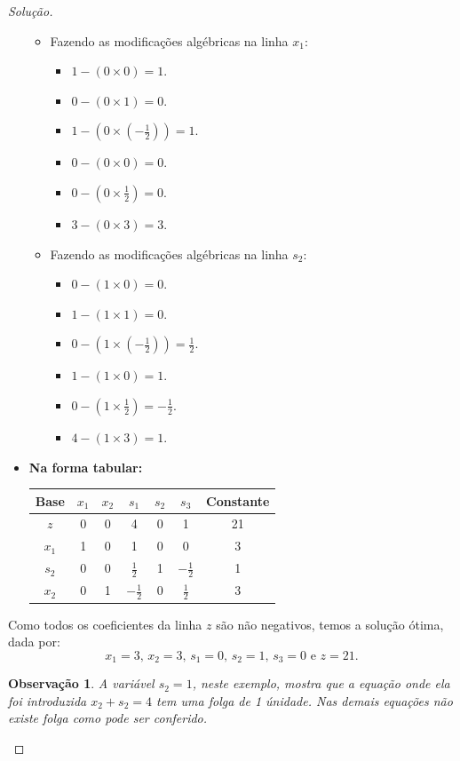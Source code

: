 \documentclass[
	12pt,				%
	openright,			%
	twoside,			%
	a4paper,			%
	english,			%
	french,				%
	brazil,				%
	sumario=tradicional
]{abntex2}
\newtheorem{remark}{Observação}
\newenvironment{solution}{
	\begin{proof}[Solução]
}{\end{proof}}
\numberwithin{example}{chapter}
\numberwithin{remark}{chapter}
\numberwithin{definition}{chapter}
\numberwithin{figure}{chapter}
\begin{document}
\begin{solution}
\begin{itemize}
\begin{itemize}
			\item Fazendo as modificações algébricas na linha $x_1$:
			\begin{itemize}
				\item $1-(0\times 0)=1$.
				\item $0-(0\times 1)=0$.
				\item $1-(0\times (-\frac{1}{2}))=1$.
				\item $0-(0\times 0)=0$.
				\item $0-(0\times \frac{1}{2})=0$.
				\item $3-(0\times 3)=3$.
			\end{itemize}
			
			\item Fazendo as modificações algébricas na linha $s_2$:
			\begin{itemize}
				\item $0-(1\times 0)=0$.
				\item $1-(1\times 1)=0$.
				\item $0-(1\times (-\frac{1}{2}))=\frac{1}{2}$.
				\item $1-(1\times 0)=1$.
				\item $0-(1\times \frac{1}{2})=-\frac{1}{2}$.
				\item $4-(1\times 3)=1$.
			\end{itemize}
		\end{itemize}
		
		\item \textbf{Na forma tabular:}
		\begin{table}[h]
			\centering
			\begin{tabular}{|c|c|c|c|c|c|c|}
				\hline
				Base & $x_1$ & $x_2$ & $s_1$ & $s_2$ & $s_3$ & Constante \\
		        \hline
		        $z$ & 0 & 0 & 4 & 0 & 1 & 21\\
		        \hline
		        $x_1$ & 1 & 0 & 1 & 0 & 0 & 3\\
		        \hline
		        $s_2$ & 0 & 0 & $\frac{1}{2}$ & 1 & $-\frac{1}{2}$ & 1\\
		        \hline
		        $x_2$ & 0 & 1 & $-\frac{1}{2}$ & 0 & $\frac{1}{2}$ & 3\\
		        \hline
			\end{tabular}
		\end{table}
	\end{itemize}
		
	Como todos os coeficientes da linha $z$ são não negativos, temos a solução ótima, dada por:
	$$x_1=3\text{, }x_2=3\text{, }s_1=0\text{, }s_2=1\text{, }s_3=0\text{ e }z=21\text{.}$$
	
	\begin{remark}
	    A variável $s_2=1$, neste exemplo, mostra que a equação onde ela foi introduzida $x_2+s_2=4$ tem uma folga de 1 únidade. Nas demais equações não existe folga como pode ser conferido.
	\end{remark}
\end{solution}
\end{document}
